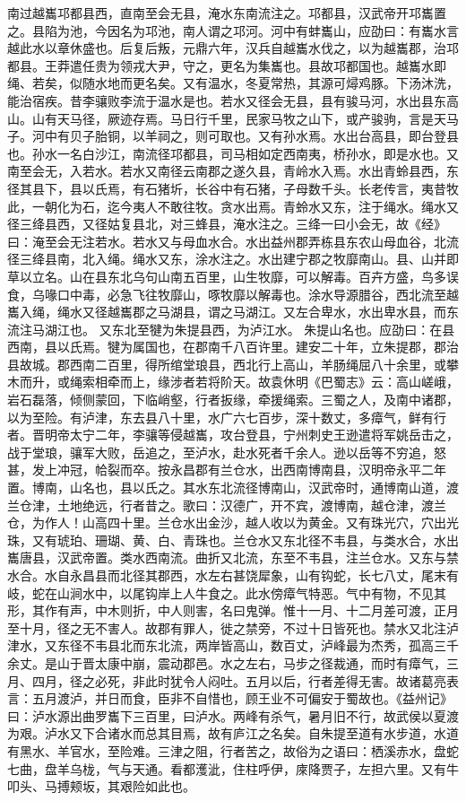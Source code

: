 \documentclass[12pt,UTF8]{ctexbook}
\begin{document}
南过越巂邛都县西，直南至会无县，淹水东南流注之。邛都县，汉武帝开邛巂置之。县陷为池，今因名为邛池，南人谓之邛河。河中有蚌巂山，应劭曰：有巂水言越此水以章休盛也。后复后叛，元鼎六年，汉兵自越巂水伐之，以为越巂郡，治邛都县。王莽遣任贵为领戎大尹，守之，更名为集巂也。县故邛都国也。越巂水即绳、若矣，似随水地而更名矣。又有温水，冬夏常热，其源可燖鸡豚。下汤沐洗，能治宿疾。昔李骧败李流于温水是也。若水又径会无县，县有骏马河，水出县东高山。山有天马径，厥迹存焉。马日行千里，民家马牧之山下，或产骏驹，言是天马子。河中有贝子胎铜，以羊祠之，则可取也。又有孙水焉。水出台高县，即台登县也。孙水一名白沙江，南流径邛都县，司马相如定西南夷，桥孙水，即是水也。又南至会无，入若水。若水又南径云南郡之遂久县，青岭水入焉。水出青蛉县西，东径其县下，县以氏焉，有石猪圻，长谷中有石猪，子母数千头。长老传言，夷昔牧此，一朝化为石，迄今夷人不敢往牧。贪水出焉。青蛉水又东，注于绳水。绳水又径三绛县西，又径姑复县北，对三蜂县，淹水注之。三绛一曰小会无，故《经》曰：淹至会无注若水。若水又与母血水合。水出益州郡弄栋县东农山母血谷，北流径三绛县南，北入绳。绳水又东，涂水注之。水出建宁郡之牧靡南山。县、山并即草以立名。山在县东北乌句山南五百里，山生牧靡，可以解毒。百卉方盛，鸟多误食，乌喙口中毒，必急飞往牧靡山，啄牧靡以解毒也。涂水导源腊谷，西北流至越巂入绳，绳水又径越巂郡之马湖县，谓之马湖江。又左合卑水，水出卑水县，而东流注马湖江也。
又东北至犍为朱提县西，为泸江水。
朱提山名也。应劭曰：在县西南，县以氏焉。犍为属国也，在郡南千八百许里。建安二十年，立朱提郡，郡治县故城。郡西南二百里，得所绾堂琅县，西北行上高山，羊肠绳屈八十余里，或攀木而升，或绳索相牵而上，缘涉者若将阶天。故袁休明《巴蜀志》云：高山嵯峨，岩石磊落，倾侧蒙回，下临峭壑，行者扳缘，牵援绳索。三蜀之人，及南中诸郡，以为至险。有泸津，东去县八十里，水广六七百步，深十数丈，多瘴气，鲜有行者。晋明帝太宁二年，李骧等侵越巂，攻台登县，宁州刺史王逊遣将军姚岳击之，战于堂琅，骧军大败，岳追之，至泸水，赴水死者千余人。逊以岳等不穷追，怒甚，发上冲冠，帢裂而卒。按永昌郡有兰仓水，出西南博南县，汉明帝永平二年置。博南，山名也，县以氏之。其水东北流径博南山，汉武帝时，通博南山道，渡兰仓津，土地绝远，行者昔之。歌曰：汉德广，开不宾，渡博南，越仓津，渡兰仓，为作人！山高四十里。兰仓水出金沙，越人收以为黄金。又有珠光穴，穴出光珠，又有琥珀、珊瑚、黄、白、青珠也。兰仓水又东北径不韦县，与类水合，水出巂唐县，汉武帝置。类水西南流。曲折又北流，东至不韦县，注兰仓水。又东与禁水合。水自永昌县而北径其郡西，水左右甚饶犀象，山有钩蛇，长七八丈，尾末有岐，蛇在山涧水中，以尾钩岸上人牛食之。此水傍瘴气特恶。气中有物，不见其形，其作有声，中木则折，中人则害，名曰鬼弹。惟十一月、十二月差可渡，正月至十月，径之无不害人。故郡有罪人，徙之禁旁，不过十日皆死也。禁水又北注泸津水，又东径不韦县北而东北流，两岸皆高山，数百丈，泸峰最为杰秀，孤高三千余丈。是山于晋太康中崩，震动郡邑。水之左右，马步之径裁通，而时有瘴气，三月、四月，径之必死，非此时犹令人闷吐。五月以后，行者差得无害。故诸葛亮表言：五月渡泸，并日而食，臣非不自惜也，顾王业不可偏安于蜀故也。《益州记》曰：泸水源出曲罗巂下三百里，曰泸水。两峰有杀气，暑月旧不行，故武侯以夏渡为艰。泸水又下合诸水而总其目焉，故有庐江之名矣。自朱提至道有水步道，水道有黑水、羊官水，至险难。三津之阻，行者苦之，故俗为之语曰：栖溪赤水，盘蛇七曲，盘羊乌栊，气与天通。看都濩泚，住柱呼伊，庲降贾子，左担六里。又有牛叩头、马搏颊坂，其艰险如此也。
\end{document}
